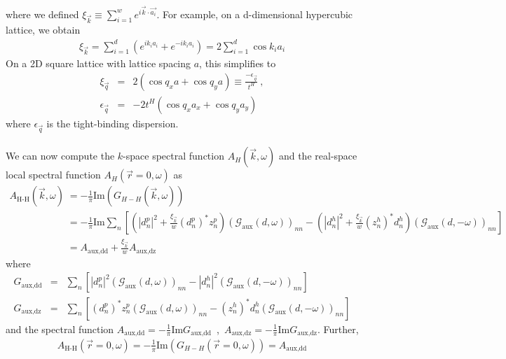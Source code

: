 \documentclass{report}
\numberwithin{equation}{section}
\begin{document}
where we defined \(\xi_{\vec k} \equiv \sum_{i=1}^w e^{i \vec{k}\cdot\vec {a_i}}\). For example, on a d-dimensional hypercubic lattice, we obtain
\begin{equation}\begin{aligned}
	\xi_{\vec k} = \sum_{i=1}^d \left(e^{i k_i {a_i}} + e^{-i k_i {a_i}}\right) = 2\sum_{i=1}^d \cos k_i a_i
\end{aligned}\end{equation}
On a 2D square lattice with lattice spacing $a$, this simplifies to
\begin{eqnarray}
	\label{2dsquaretb}
\xi_{\vec{q}} &=& 2(\cos q_{x}a + \cos q_{y}a)\equiv \frac{-\epsilon_{\vec{q}}}{t^{H}}~,\nonumber\\
\epsilon_{\vec{q}} &=& -2t^{H}(\cos q_{x}a_{x} + \cos q_{y}a_{y})~
\end{eqnarray}
where \(\epsilon_{\vec{q}}\) is the tight-binding dispersion.
\\\\
We can now compute the $k$-space spectral function $A_{H}(\vec{k},\omega)$ and the real-space local spectral function $A_{H}(\vec{r}=0,\omega)$ as
\begin{equation}\begin{aligned}
	A_\text{H-H}(\vec{k},\omega) &= -\frac{1}{\pi} \textrm{Im}(G_{H-H}(\vec{k},\omega))\\ 
	&= -\frac{1}{\pi} \textrm{Im}\sum_n\left[\left(|d^p_n|^2 + \frac{\xi_{\vec k}}{w}\left(d^p_n\right)^* z^p_n\right) \left(\mathcal{G}_\text{aux}(d, \omega)\right)_{nn} - \left(|d^h_n|^2 + \frac{\xi_{\vec k}}{w}\left(z^h_n\right)^* d^h_n\right)\left(\mathcal{G}_\text{aux}(d, -\omega)\right)_{nn}\right]\\
	&= A_\text{aux,dd} + \frac{\xi_{\vec k}}{w} A_\text{aux,dz}
\end{aligned}\end{equation}
where 
\begin{eqnarray}
G_\text{aux,dd} &=& \sum_n\left[|d^p_n|^2 \left(\mathcal{G}_\text{aux}(d, \omega)\right)_{nn} - |d^h_n|^2 \left(\mathcal{G}_\text{aux}(d, -\omega)\right)_{nn}\right]\nonumber\\
G_\text{aux,dz} &=& \sum_n\left[\left(d^p_n\right)^* z^p_n \left(\mathcal{G}_\text{aux}(d, \omega)\right)_{nn} - \left(z^h_n\right)^* d^h_n \left(\mathcal{G}_\text{aux}(d, -\omega)\right)_{nn}\right]
\end{eqnarray}
and the spectral function $A_\text{aux,dd}=-\frac{1}{\pi}\textrm{Im}G_\text{aux,dd}$~,~$A_\text{aux,dz}=-\frac{1}{\pi}\textrm{Im}G_\text{aux,dz}$.
Further,
\begin{equation}\begin{aligned}
A_\text{H-H}(\vec{r}=0,\omega) = -\frac{1}{\pi} \textrm{Im}(G_{H-H}(\vec{r}=0,\omega)) 
= A_\text{aux,dd}
\label{main}
\end{aligned}\end{equation}
\end{document}

